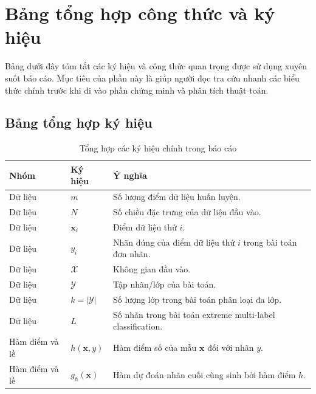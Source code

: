 \section{Bảng tổng hợp công thức và ký hiệu}

Bảng dưới đây tóm tắt các ký hiệu và công thức quan trọng được sử dụng xuyên suốt báo cáo. Mục tiêu của phần này là giúp người đọc tra cứu nhanh các biểu thức chính trước khi đi vào phần chứng minh và phân tích thuật toán.


\subsection{Bảng tổng hợp ký hiệu}

\renewcommand{\arraystretch}{1.22}
\setlength{\tabcolsep}{6pt}
\begin{table}[H]
\centering
\small
\caption{Tổng hợp các ký hiệu chính trong báo cáo}
\begin{tabular}{|>{\raggedright\arraybackslash}p{3.2cm}|>{\raggedright\arraybackslash}p{4.2cm}|>{\raggedright\arraybackslash}p{6.6cm}|}
\hline
\textbf{Nhóm} & \textbf{Ký hiệu} & \textbf{Ý nghĩa} \\
\hline
Dữ liệu & $m$ & Số lượng điểm dữ liệu huấn luyện. \\
\hline
Dữ liệu & $N$ & Số chiều đặc trưng của dữ liệu đầu vào. \\
\hline
Dữ liệu & $\bm{x}_i$ & Điểm dữ liệu thứ $i$. \\
\hline
Dữ liệu & $y_i$ & Nhãn đúng của điểm dữ liệu thứ $i$ trong bài toán đơn nhãn. \\
\hline
Dữ liệu & $\mathcal{X}$ & Không gian đầu vào. \\
\hline
Dữ liệu & $\mathcal{Y}$ & Tập nhãn/lớp của bài toán. \\
\hline
Dữ liệu & $k=|\mathcal{Y}|$ & Số lượng lớp trong bài toán phân loại đa lớp. \\
\hline
Dữ liệu & $L$ & Số nhãn trong bài toán extreme multi-label classification. \\
\hline
Hàm điểm và lề & $h(\bm{x},y)$ & Hàm điểm số của mẫu $\bm{x}$ đối với nhãn $y$. \\
\hline
Hàm điểm và lề & $g_h(\bm{x})$ & Hàm dự đoán nhãn cuối cùng sinh bởi hàm điểm $h$. \\
\hline
\end{tabular}
\end{table}

